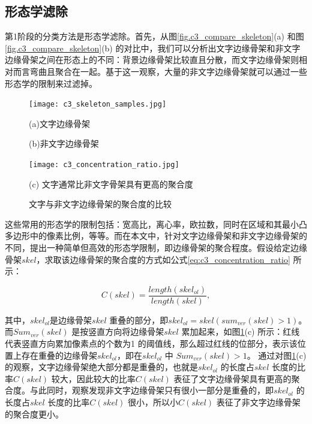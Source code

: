         \subsection{形态学滤除}

        第1阶段的分类方法是形态学滤除。首先，从图\ref{fig.c3_compare_skeleton}(a) 和图\ref{fig.c3_compare_skeleton}(b) 的对比中，我们可以分析出文字边缘骨架和非文字边缘骨架之间在形态上的不同：背景边缘骨架比较直且分散，而文字边缘骨架则相对而言弯曲且聚合在一起。基于这一观察，大量的非文字边缘骨架就可以通过一些形态学的限制来过滤掉。

        \begin{figure}[!h]
        \centering
        \texttt{[image: c3\_skeleton\_samples.jpg]}
        \begin{minipage}[t]{0.48\linewidth}
        \centerline{\small (a)文字边缘骨架}
        \end{minipage}
        \begin{minipage}[t]{0.48\linewidth}
        \centerline{\small (b)非文字边缘骨架}
        \end{minipage}
        \texttt{[image: c3\_concentration\_ratio.jpg]}
        \centerline{\small (c) 文字通常比非文字骨架具有更高的聚合度}
        \caption{文字与非文字边缘骨架的聚合度的比较} \label{fig.c3_concentration_ratio}
        \end{figure}

        这些常用的形态学的限制包括：宽高比，离心率，欧拉数，同时在区域和其最小凸多边形中的像素比例，等等。而在本文中，针对文字边缘骨架和非文字边缘骨架的不同，提出一种简单但高效的形态学限制，即边缘骨架的聚合程度。假设给定边缘骨架$skel$，求取该边缘骨架的聚合度的方式如公式\ref{eq:c3_concentration_ratio} 所示：

        \begin{equation}
        C(skel)=\frac{length(skel_{ol})}{length(skel)},
        \label{eq:c3_concentration_ratio}
        \end{equation}

        其中，$skel_{ol}$是边缘骨架$skel$ 重叠的部分，即$skel_{ol}=skel(sum_{ver}(skel)>1)$。 而$Sum_{ver}(skel)$ 是按竖直方向将边缘骨架$skel$ 累加起来，如图\ref{fig.c3_concentration_ratio}(c) 所示：红线代表竖直方向累加像素点的个数为1 的阈值线，那么超过红线的位部分，表示该位置上存在重叠的边缘骨架$skel_{ol}$，即在$skel_{ol}$ 中 $Sum_{ver}(skel)>1$。 通过对图\ref{fig.c3_concentration_ratio}(c) 的观察，文字边缘骨架绝大部分都是重叠的，也就是$skel_{ol}$ 的长度占$skel$ 长度的比率$C(skel)$ 较大，因此较大的比率$C(skel)$ 表征了文字边缘骨架具有更高的聚合度。与此同时，观察发现非文字边缘骨架只有很小一部分是重叠的，即$skel_{ol}$ 的长度占$skel$ 长度的比率$C(skel)$ 很小，所以小$C(skel)$ 表征了非文字边缘骨架的聚合度更小。

